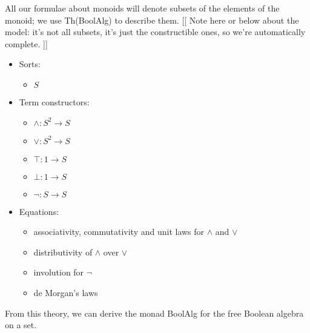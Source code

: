 \documentclass{article}
\newcommand{\maps}{\colon}
\begin{document}
All our formulae about monoids will denote subsets of the elements of the monoid; we use Th(BoolAlg) to describe them. [[ Note here or below about the model: it's not all subsets, it's just the constructible ones, so we're automatically complete. ]]
\begin{center}
  \begin{itemize}
    \item Sorts:
    \begin{itemize}
      \item $S$
    \end{itemize}
    \item Term constructors:
    \begin{itemize}
      \item $\land\maps S^2 \to S$
      \item $\lor\maps S^2 \to S$
      \item $\top\maps 1 \to S$
      \item $\bot\maps 1 \to S$
      \item $\neg\maps S \to S$
    \end{itemize}
    \item Equations:
    \begin{itemize}
      \item associativity, commutativity and unit laws for $\land$ and $\lor$
      \item distributivity of $\land$ over $\lor$
      \item involution for $\neg$
      \item de Morgan's laws
    \end{itemize}
  \end{itemize}
\end{center}
From this theory, we can derive the monad BoolAlg for the free Boolean algebra on a set.
\end{document}
